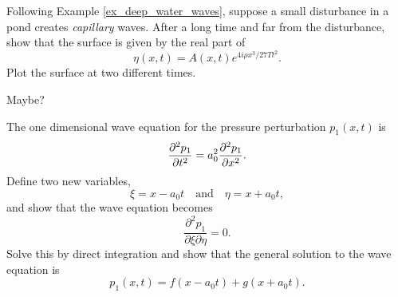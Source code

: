 \begin{problem}
Following Example \ref{ex_deep_water_waves}, suppose a small disturbance in a pond creates \emph{capillary} waves.  After a long time and far from the disturbance, show that the surface is given by the real part of
\[
\eta(x, t) = A(x, t) e^{4i\rho x^3 / 27 T t^2}.
\]
Plot the surface at two different times.
\end{problem}


\begin{problem}
Maybe?
\end{problem}


\begin{problem}
\label{prob_wave_sol}
The one dimensional wave equation for the pressure perturbation $p_1(x, t)$ is
\[
\frac{\partial^2 {p_1}}{\partial {t}^2} = a_0^2 \frac{\partial^2 {p_1}}{\partial {x}^2}.
\]
Define two new variables,
\[
\xi = x - a_0t \quad \text{and}\quad \eta = x + a_0t,
\]
and show that the wave equation becomes
\[
\frac{\partial ^2 p_1}{\partial \xi \partial \eta} = 0.
\]
Solve this by direct integration and show that the general solution to the wave equation is
\[
p_1(x, t) = f(x - a_0t) + g(x + a_0t).
\]
\end{problem}





